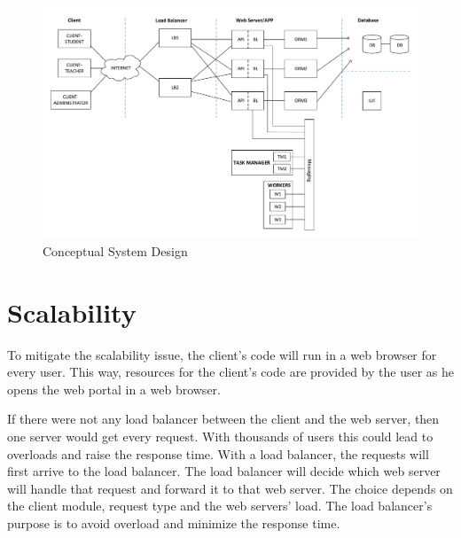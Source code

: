 \begin{landscape}
	\begin{figure}[!htbp]
		\centering
		\includegraphics[height=0.95\textwidth]{figures/atfogo_rendszerterv_teljes.pdf}
		\caption[Conceptual System Design]{Conceptual System Design}
		\label{fig:conceptional-system-design}
	\end{figure}
\end{landscape}

\section{Scalability}\label{scalability}

To mitigate the scalability issue, the client's code will run in a web browser for every user. This way, resources for the client's code are provided by the user as he opens the web portal in a web browser.
 
If there were not any load balancer between the client and the web server, then one server would get every request. With thousands of users this could lead to overloads and raise the response time. With a load balancer, the requests will first arrive to the load balancer. The load balancer will decide which web server will handle that request and forward it to that web server. The choice depends on the client module, request type and the web servers' load. The load balancer's purpose is to avoid overload and minimize the response time.


